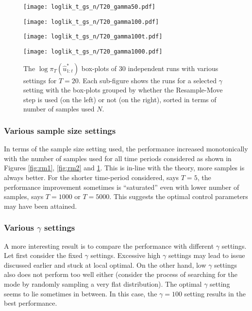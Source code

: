 \begin{figure}[!thbp]
    \centering
    \begin{minipage}{0.5\textwidth}
        \centering
        \texttt{[image: loglik\_t\_gs\_n/T20\_gamma50.pdf]}
    \end{minipage}%
    \begin{minipage}{0.5\textwidth}
        \centering
        \texttt{[image: loglik\_t\_gs\_n/T20\_gamma100.pdf]}
    \end{minipage}
    \begin{minipage}{0.5\textwidth}
        \centering
        \texttt{[image: loglik\_t\_gs\_n/T20\_gamma100t.pdf]}
    \end{minipage}%
    \begin{minipage}{0.5\textwidth}
        \centering
        \texttt{[image: loglik\_t\_gs\_n/T20\_gamma1000.pdf]}
    \end{minipage}
    \caption{The $\log\pi_T(\hat{u}^*_{1:t})$ box-plots of 30 independent runs with various settings for $T=20$. Each sub-figure shows the runs for a selected $\gamma$ setting with the box-plots grouped by whether the Resample-Move step is used (on the left) or not (on the right), sorted in terms of number of samples used $N$.}
    \label{fig:rm3}
\end{figure}

\subsubsection{Various sample size settings}
In terms of the sample size setting used, the performance increased monotonically with the number of samples used for all time periods considered as shown in Figures \ref{fig:rm1}, \ref{fig:rm2} and \ref{fig:rm3}. This is in-line with the theory, more samples is always better. For the shorter time-period considered, says $T=5$, the performance improvement sometimes is ``saturated'' even with lower number of samples, says $T=1000$ or $T=5000$. This suggests the optimal control parameters may have been attained.

 \subsubsection{Various $\gamma$ settings}
A more interesting result is to compare the performance with different $\gamma$ settings. Let first consider the fixed $\gamma$ settings. Excessive high $\gamma$ settings may lead to issue discussed earlier and stuck at local optimal. On the other hand, low $\gamma$ settings also does not perform too well either (consider the process of searching for the mode by randomly sampling a very flat distribution). The optimal $\gamma$ setting seems to lie sometimes in between. In this case, the $\gamma=100$ setting results in the best performance.

